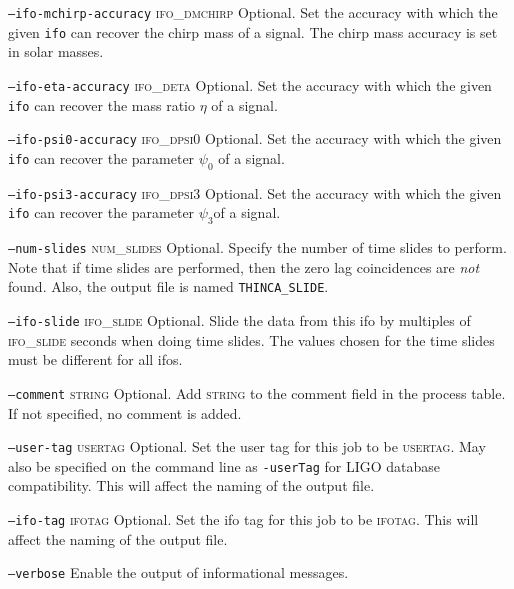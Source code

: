 \begin{entry}
\begin{entry}
\item[\texttt{--ifo-mchirp-accuracy} \textsc{ifo\_dmchirp}] Optional. Set the
accuracy with which the given \texttt{ifo} can recover the chirp mass of a
signal.  The chirp mass accuracy is set in solar masses.

\item[\texttt{--ifo-eta-accuracy} \textsc{ifo\_deta}] Optional. Set the
accuracy with which the given \texttt{ifo} can recover the mass ratio $\eta$
of a signal.

\item[\texttt{--ifo-psi0-accuracy} \textsc{ifo\_dpsi0}] Optional. Set the
accuracy with which the given \texttt{ifo} can recover the parameter
$\psi_{0}$ of a signal.

\item[\texttt{--ifo-psi3-accuracy} \textsc{ifo\_dpsi3}] Optional. Set the
accuracy with which the given \texttt{ifo} can recover the parameter
$\psi_{3}$of a signal.

\item[\texttt{--num-slides} \textsc{num\_slides}] Optional.  Specify the
number of time slides to perform. Note that if time slides are performed, 
then the zero lag coincidences are \textit{not} found. Also, the output file 
is named \texttt{THINCA\_SLIDE}.

\item[\texttt{--ifo-slide} \textsc{ifo\_slide}] Optional.  Slide the data from 
this ifo by multiples of \textsc{ifo\_slide} seconds when doing time slides.  
The values chosen for the time slides must be different for all ifos.

\item[\texttt{--comment} \textsc{string}] Optional. Add \textsc{string}
to the comment field in the process table. If not specified, no comment
is added. 

\item[\texttt{--user-tag} \textsc{usertag}] Optional. Set the user tag for
this job to be \textsc{usertag}. May also be specified on the command line as
\texttt{-userTag} for LIGO database compatibility.  This will affect the
naming of the output file.

\item[\texttt{--ifo-tag} \textsc{ifotag}] Optional. Set the ifo tag for this
job to be \textsc{ifotag}. This will affect the naming of the output file.

\item[\texttt{--verbose}] Enable the output of informational messages.


\end{entry}
\end{entry}
